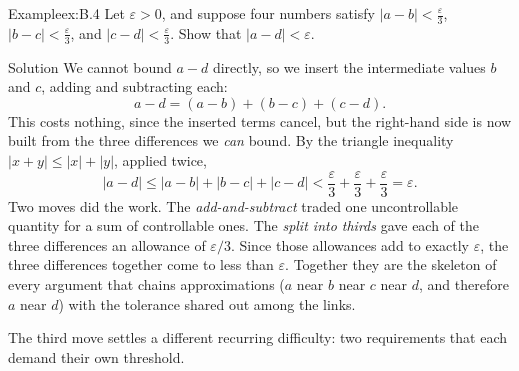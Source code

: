\documentclass[a4paper,12pt,oneside]{memoir}
\begin{document}
\begin{workedexample}
\begin{envexample}{Example}{ex:B.4}{}
Let \(\varepsilon > 0\), and suppose four numbers satisfy \(|a - b| < \tfrac{\varepsilon}{3}\), \(|b - c| < \tfrac{\varepsilon}{3}\), and \(|c - d| < \tfrac{\varepsilon}{3}\). Show that \(|a - d| < \varepsilon\).
\end{envexample}
\begin{envsolution}{Solution}{}{}
We cannot bound \(a - d\) directly, so we insert the intermediate values \(b\) and \(c\), adding and subtracting each: \[ a - d = (a - b) + (b - c) + (c - d). \] This costs nothing, since the inserted terms cancel, but the right-hand side is now built from the three differences we \emph{can} bound. By the triangle inequality \(|x + y| \le |x| + |y|\), applied twice, \[ |a - d| \le |a - b| + |b - c| + |c - d| < \frac{\varepsilon}{3} + \frac{\varepsilon}{3} + \frac{\varepsilon}{3} = \varepsilon. \] Two moves did the work. The \emph{add-and-subtract} traded one uncontrollable quantity for a sum of controllable ones. The \emph{split into thirds} gave each of the three differences an allowance of \(\varepsilon/3\). Since those allowances add to exactly \(\varepsilon\), the three differences together come to less than \(\varepsilon\). Together they are the skeleton of every argument that chains approximations (\(a\) near \(b\) near \(c\) near \(d\), and therefore \(a\) near \(d\)) with the tolerance shared out among the links.
\end{envsolution}
\end{workedexample}
The third move settles a different recurring difficulty: two requirements that each demand their own threshold.
\end{document}
